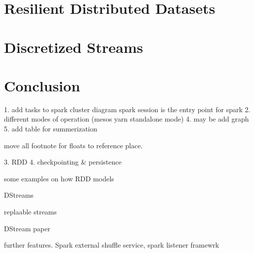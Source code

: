 \section{Resilient Distributed Datasets}
\label{sp:rdd}

\section{Discretized Streams}
\label{sp:dstream}

\section{Conclusion}
\label{sp:conc}

1. add tasks to spark cluster diagram
spark session is the entry point for spark
2. different modes of operation (mesos yarn standalone mode)
    4. may be add graph
    5. add table for summerization
    
    move all footnote for floats to reference place.

3. RDD
4. checkpointing \& persistence

some examples on how RDD models 

DStreams

replaable streams

DStream paper

further features.
Spark external shuffle service, spark listener framewrk

